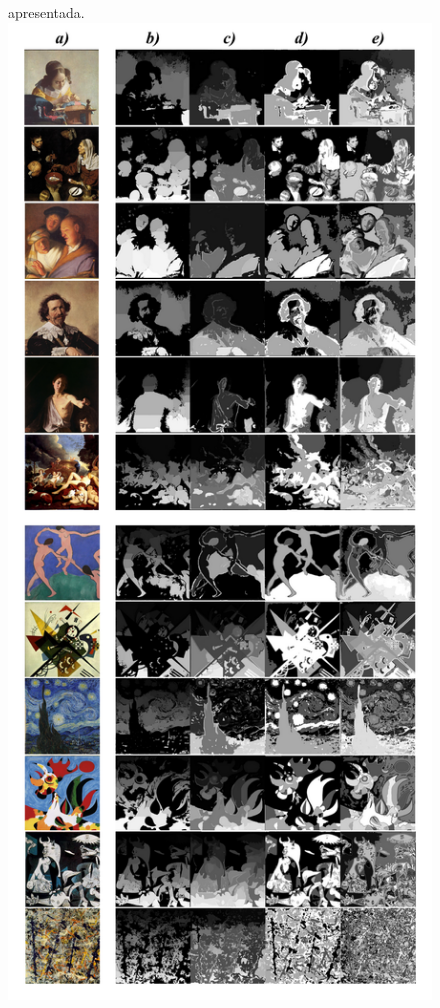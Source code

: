\begin{figure}[h!]
\begin{center}
{        apresentada.}  \label{fig:expsegs} \includegraphics[scale=.3]{figs/expsegs} \fonteminha
\end{center}
\end{figure}

